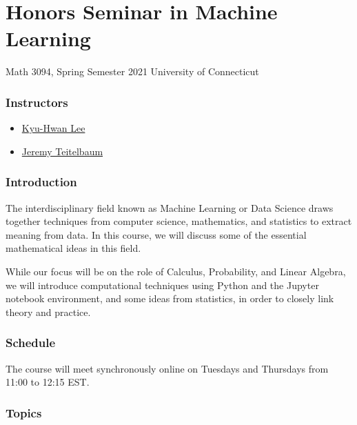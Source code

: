 \documentclass[
]{article}
\author{}
\date{}
\providecommand{\tightlist}{%
  \setlength{\itemsep}{0pt}\setlength{\parskip}{0pt}}
\begin{document}
\hypertarget{honors-seminar-in-machine-learning}{%
\section{Honors Seminar in Machine
Learning}\label{honors-seminar-in-machine-learning}}

Math 3094, Spring Semester 2021 University of Connecticut

\hypertarget{instructors}{%
\subsubsection{Instructors}\label{instructors}}

\begin{itemize}
\tightlist
\item
  \href{mailto:khlee@math.uconn.edu}{Kyu-Hwan Lee}
\item
  \href{mailto:jeremy.teitelbaum@uconn.edu}{Jeremy Teitelbaum}
\end{itemize}

\hypertarget{introduction}{%
\subsubsection{Introduction}\label{introduction}}

The interdisciplinary field known as Machine Learning or Data Science
draws together techniques from computer science, mathematics, and
statistics to extract meaning from data. In this course, we will discuss
some of the essential mathematical ideas in this field.

While our focus will be on the role of Calculus, Probability, and Linear
Algebra, we will introduce computational techniques using Python and the
Jupyter notebook environment, and some ideas from statistics, in order
to closely link theory and practice.

\hypertarget{schedule}{%
\subsubsection{Schedule}\label{schedule}}

The course will meet synchronously online on Tuesdays and Thursdays from
11:00 to 12:15 EST.

\hypertarget{topics}{%
\subsubsection{Topics}\label{topics}}
\end{document}
